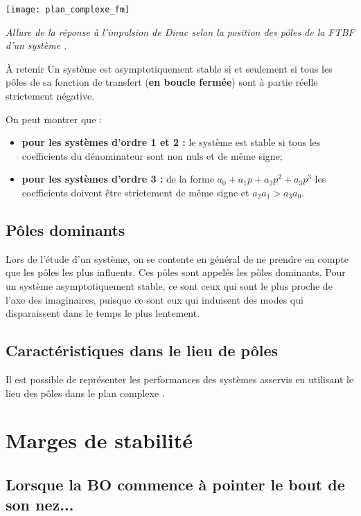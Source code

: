 \begin{center}
\texttt{[image: plan\_complexe\_fm]}

\textit{Allure de la réponse à l’impulsion de Dirac selon la position des pôles de la FTBF d’un système \cite{2}.}
\end{center}

\begin{defi}{À retenir}
Un système est asymptotiquement stable si et seulement si tous les pôles de sa fonction de transfert (\textbf{en boucle fermée}) sont à partie réelle strictement négative. 

\end{defi}

\begin{remarque}On peut montrer que :
\begin{itemize}
\item \textbf{pour les systèmes d'ordre 1 et 2 :} le système est stable si tous les coefficients du dénominateur sont non nuls et de même signe;
\item \textbf{pour les systèmes d'ordre 3 :} de la forme $a_0+a_1p+a_2p^2+a_3p^3$ les coefficients doivent être strictement de même signe et $a_2 a_1 > a_3 a_0$.
\end{itemize}
\end{remarque}

\subsection{Pôles dominants \cite{1}}
Lors de l’étude d’un système, on se contente en général de ne prendre en compte que les pôles les plus influents. Ces pôles sont appelés les pôles dominants. Pour un système asymptotiquement stable, ce sont ceux qui sont le plus proche de l’axe des imaginaires, puisque ce sont eux qui induisent des modes qui disparaissent dans le temps le plus lentement.

\subsection{Caractéristiques dans le lieu de pôles}
Il est possible de représenter les performances des systèmes asservis en utilisant le lieu des pôles dans le plan complexe \cite{1}. 

\section{Marges de stabilité}
\subsection{Lorsque la BO commence à pointer le bout de son nez...}


